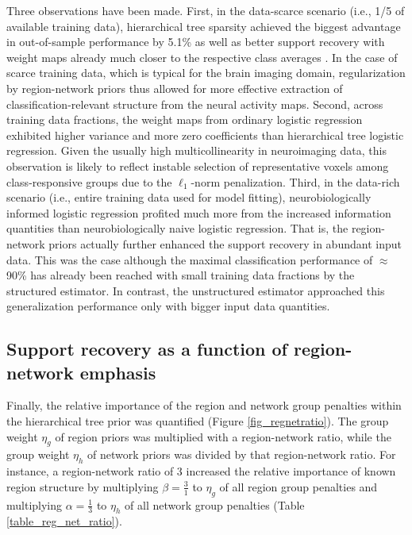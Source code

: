 \documentclass[runningheads,a4paper]{llncs}
\begin{document}
%
Three observations have been made.
First,
in the data-scarce scenario (i.e., 1/5 of available training data),
hierarchical tree sparsity achieved the biggest advantage
in out-of-sample performance by 5.1\% as well as
better support recovery with weight maps already much closer
to the respective class averages
\cite{varoquaux2012small}.
In the case of scarce training data, which is typical for the brain imaging domain,
regularization by region-network priors thus allowed for
more effective extraction of classification-relevant structure
from the neural activity maps.
%
Second,
across training data fractions,
the weight maps from ordinary logistic regression exhibited
higher variance and more zero coefficients
than hierarchical tree logistic regression.
Given the usually high multicollinearity in neuroimaging data,
this observation is likely to reflect instable selection of
representative voxels among class-responsive groups
due to the $\ell_1$-norm penalization.
%
Third,
in the data-rich scenario (i.e., entire training data used for model fitting),
neurobiologically informed logistic regression
profited much more from the increased information quantities than
neurobiologically naive logistic regression.
That is, the region-network priors actually further enhanced the support
recovery in abundant input data.
This was the case although
the maximal classification performance of $\approx$90\% has already
been reached with small training data fractions by the structured estimator.
In contrast, 
the unstructured estimator approached this generalization performance
only with bigger input data quantities.
%
\subsection{Support recovery as a function of region-network emphasis}
Finally, the relative importance of the
region and network group penalties within the hierarchical tree prior
was quantified (Figure \ref{fig_regnetratio}).
The group weight $\eta_g$ of region priors was multiplied with a
region-network ratio, while the
group weight $\eta_h$ of network priors was divided by that
region-network ratio. For instance, a region-network ratio of 3
increased the relative importance of known region structure
by multiplying $\beta = \frac{3}{1}$ to
$\eta_g$ of all region group penalties
and multiplying
$\alpha = \frac{1}{3}$ to $\eta_h$ of all network group penalties
(Table \ref{table_reg_net_ratio}).
\end{document}
